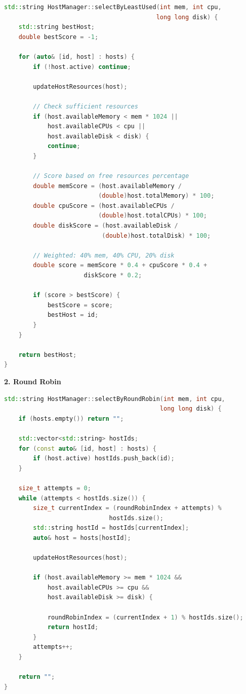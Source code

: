 \documentclass[12pt,a4paper]{article}
\begin{document}
\begin{lstlisting}[language=C++, caption=Stratégie Least Used]
std::string HostManager::selectByLeastUsed(int mem, int cpu, 
                                          long long disk) {
    std::string bestHost;
    double bestScore = -1;
    
    for (auto& [id, host] : hosts) {
        if (!host.active) continue;
        
        updateHostResources(host);
        
        // Check sufficient resources
        if (host.availableMemory < mem * 1024 ||
            host.availableCPUs < cpu ||
            host.availableDisk < disk) {
            continue;
        }
        
        // Score based on free resources percentage
        double memScore = (host.availableMemory / 
                          (double)host.totalMemory) * 100;
        double cpuScore = (host.availableCPUs / 
                          (double)host.totalCPUs) * 100;
        double diskScore = (host.availableDisk / 
                           (double)host.totalDisk) * 100;
        
        // Weighted: 40% mem, 40% CPU, 20% disk
        double score = memScore * 0.4 + cpuScore * 0.4 + 
                      diskScore * 0.2;
        
        if (score > bestScore) {
            bestScore = score;
            bestHost = id;
        }
    }
    
    return bestHost;
}
\end{lstlisting}

\textbf{2. Round Robin}

\begin{lstlisting}[language=C++, caption=Stratégie Round Robin]
std::string HostManager::selectByRoundRobin(int mem, int cpu, 
                                           long long disk) {
    if (hosts.empty()) return "";
    
    std::vector<std::string> hostIds;
    for (const auto& [id, host] : hosts) {
        if (host.active) hostIds.push_back(id);
    }
    
    size_t attempts = 0;
    while (attempts < hostIds.size()) {
        size_t currentIndex = (roundRobinIndex + attempts) % 
                             hostIds.size();
        std::string hostId = hostIds[currentIndex];
        auto& host = hosts[hostId];
        
        updateHostResources(host);
        
        if (host.availableMemory >= mem * 1024 &&
            host.availableCPUs >= cpu &&
            host.availableDisk >= disk) {
            
            roundRobinIndex = (currentIndex + 1) % hostIds.size();
            return hostId;
        }
        attempts++;
    }
    
    return "";
}
\end{lstlisting}
\end{document}
